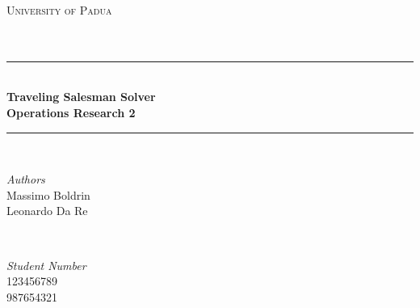 \documentclass[a4paper]{article}
\begin{document}
\begin{titlepage} %
	\newcommand{\HRule}{\rule{\linewidth}{0.5mm}} %
	
	\center %
	
	
	\textsc{\LARGE University of Padua}\\[1.5cm] %
	
	\textsc{\Large }\\[0.5cm] %
	
	\textsc{\large }\\[0.5cm] %
	
	
	\HRule\\[0.4cm]
	
	{\huge\bfseries Traveling Salesman Solver \\ Operations Research 2}\\[0.4cm] %
	
	\HRule\\[1.5cm]
	
	
	\begin{minipage}{0.4\textwidth}
		\begin{flushleft}
			\large
			\textit{Authors}\\
			Massimo Boldrin \\
            Leonardo Da Re
		\end{flushleft}
	\end{minipage}
	~
	\begin{minipage}{0.4\textwidth}
		\begin{flushright}
			\large
			\textit{Student Number}\\
			123456789 \\
            987654321
		\end{flushright}
	\end{minipage}
	

\end{titlepage}
\end{document}
